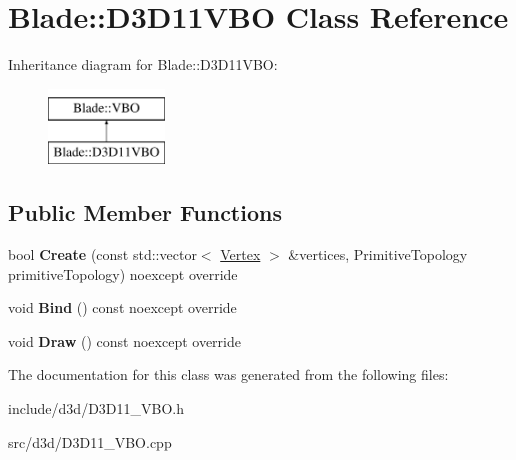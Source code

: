 \hypertarget{class_blade_1_1_d3_d11_v_b_o}{}\section{Blade\+:\+:D3\+D11\+V\+BO Class Reference}
\label{class_blade_1_1_d3_d11_v_b_o}
Inheritance diagram for Blade\+:\+:D3\+D11\+V\+BO\+:\begin{figure}[H]
\begin{center}
\leavevmode
\includegraphics[height=2.000000cm]{class_blade_1_1_d3_d11_v_b_o}
\end{center}
\end{figure}
\subsection*{Public Member Functions}
\begin{DoxyCompactItemize}
\item 
\mbox{\label{class_blade_1_1_d3_d11_v_b_o_aa30ee7b65016369210ddf1d41d2f1b67}} 
bool {\bfseries Create} (const std\+::vector$<$ \hyperlink{struct_blade_1_1_vertex}{Vertex} $>$ \&vertices, Primitive\+Topology primitive\+Topology) noexcept override
\item 
\mbox{\label{class_blade_1_1_d3_d11_v_b_o_a0be54095e27991cfaa49344de362ec5c}} 
void {\bfseries Bind} () const noexcept override
\item 
\mbox{\label{class_blade_1_1_d3_d11_v_b_o_a76fd571af99bb036c429bbb310a9cabe}} 
void {\bfseries Draw} () const noexcept override
\end{DoxyCompactItemize}


The documentation for this class was generated from the following files\+:\begin{DoxyCompactItemize}
\item 
include/d3d/D3\+D11\+\_\+\+V\+B\+O.\+h\item 
src/d3d/D3\+D11\+\_\+\+V\+B\+O.\+cpp\end{DoxyCompactItemize}
